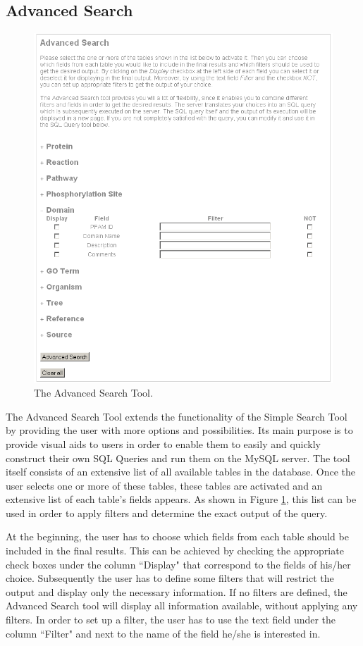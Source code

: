 \subsection{Advanced Search}
\begin{figure}[hp]
\centering
\includegraphics[scale=0.6]{pictures/AdvancedSearchTool.png}
\caption{The Advanced Search Tool.}
\label{advancedsearchtool}
\end{figure}
The Advanced Search Tool extends the functionality of the Simple Search Tool by providing the user with more options and possibilities.
Its main purpose is to provide visual aids to users in order to enable them to easily and quickly construct their own SQL Queries and run them on the MySQL server.
The tool itself consists of an extensive list of all available tables in the database.
Once the user selects one or more of these tables, these tables are activated and an extensive list of each table's fields appears.
As shown in Figure \ref{advancedsearchtool}, this list can be used in order to apply filters and determine the exact output of the query.

At the beginning, the user has to choose which fields from each table should be included in the final results.
This can be achieved by checking the appropriate check boxes under the column ``Display" that correspond to the fields of his/her choice.
Subsequently the user has to define some filters that will restrict the output and display only the necessary information.
If no filters are defined, the Advanced Search tool will display all information available, without applying any filters.
In order to set up a filter, the user has to use the text field under the column ``Filter" and next to the name of the field he/she is interested in.

